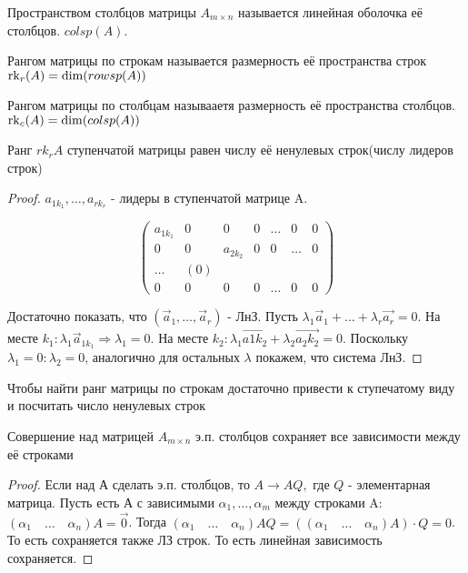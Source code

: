 \begin{definition}
	Пространством столбцов матрицы \(A_{m\times n}\) называется линейная оболочка её столбцов. \(colsp(A)\).
\end{definition}
\begin{definition}
	Рангом матрицы по строкам называется размерность её пространства строк \(\operatorname{rk}_r(A) = \dim(rowsp(A))\)
\end{definition}
\begin{definition}
	Рангом матрицы по столбцам называаетя размерность её пространства столбцов. \(\operatorname{rk}_c(A)=\dim(colsp(A))\)
\end{definition}
\begin{proposition}
	Ранг \(rk_rA\) ступенчатой матрицы равен числу её ненулевых строк(числу лидеров строк)
\end{proposition}
\begin{proof}
	\(a_{1k_1}, \ldots, a_{rk_r}\) - лидеры в ступенчатой матрице A. \newline
	
	\[\begin{pmatrix}
		a_{1k_1} & 0 &0 & 0 & \ldots & 0 & 0 \\
		0 & 0 & a_{2k_2} & 0 & 0 &\ldots & 0 \\
		\ldots &(0) \\
		0& 0 & 0 & 0 & \ldots & 0 & 0
	\end{pmatrix}\]

	Достаточно показать, что  \((\vec a_1, \ldots, \vec a_r)\) - ЛнЗ. Пусть \(\lambda_1\vec a_1 +\ldots + \lambda_r\vec{a_r} = 0\). На месте \(k_1: \lambda_1\vec a_{1k_1}\Longrightarrow \lambda_1 = 0\). На месте \(k_2: \lambda_1\vec{a1k_2}+\lambda_2\vec{a_2k_2} = 0\). Поскольку $\lambda_1=0: \lambda_2 = 0$, аналогично для остальных $\lambda$ покажем, что система ЛнЗ.
\end{proof}
\begin{corollary}
	Чтобы найти ранг матрицы по строкам достаточно привести к ступечатому виду и посчитать число ненулевых строк
\end{corollary}
\begin{proposition}
	Совершение над матрицей \(A_{m\times n}\) э.п. столбцов сохраняет все зависимости между её строками
\end{proposition}
\begin{proof}
	Если над А сделать э.п. столбцов, то \(A\to AQ,\) где \(Q\) - элементарная матрица. Пусть есть А с зависимыми \(\alpha_1, \ldots, \alpha_m\) между строками A: \((\alpha_1 \quad \ldots \quad \alpha_n)A = \vec 0\). Тогда \((\alpha_1 \quad \ldots \quad \alpha_n)AQ = ((\alpha_1 \quad \ldots \quad \alpha_n)A)\cdot Q = 0\). То есть сохраняется также ЛЗ строк. То есть линейная зависимость сохраняется.
\end{proof}

